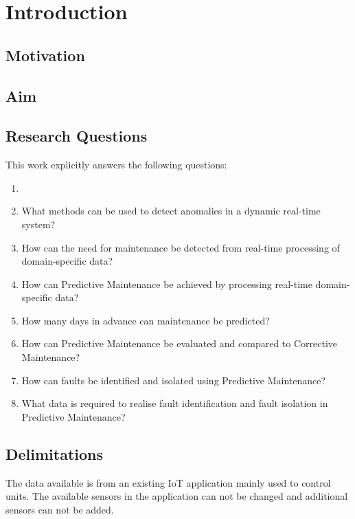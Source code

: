 \chapter{Introduction}
\label{cha:introduction}

\section{Motivation}
\label{sec:motivation}

\section{Aim}
\label{sec:aim}

\section{Research Questions}
\label{sec:research-questions}
This work explicitly answers the following questions:
\begin{enumerate}
  \item \textit{}
  \item What methods can be used to detect anomalies in a dynamic real-time system?
  \item How can the need for maintenance be detected from real-time processing of domain-specific data?
  \item How can Predictive Maintenance be achieved by processing real-time domain-specific data?
  \item How many days in advance can maintenance be predicted?
  \item How can Predictive Maintenance be evaluated and compared to Corrective Maintenance?
  \item How can faults be identified and isolated using Predictive Maintenance?
  \item What data is required to realise fault identification and fault isolation in Predictive Maintenance?
\end{enumerate}

\section{Delimitations}
\label{sec:delimitations}
The data available is from an existing IoT application mainly used to control units.
The available sensors in the application can not be changed and additional sensors can not be added.